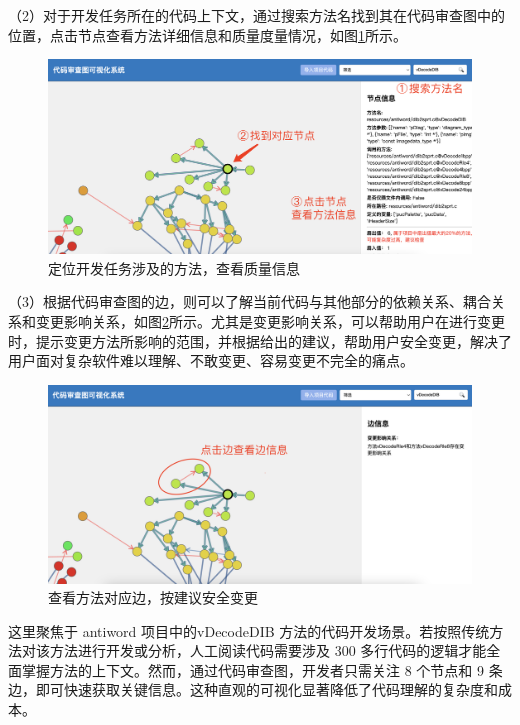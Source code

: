 \noindent（2）对于开发任务所在的代码上下文，通过搜索方法名找到其在代码审查图中的位置，点击节点查看方法详细信息和质量度量情况，如图\ref{1_定位开发任务涉及的方法，查看质量信息}所示。

\begin{figure}[h]
\centering
\includegraphics[width = 1.0\textwidth]{figures/开发2.jpg}
\caption{定位开发任务涉及的方法，查看质量信息}
\label{1_定位开发任务涉及的方法，查看质量信息}
\end{figure}

\noindent（3）根据代码审查图的边，则可以了解当前代码与其他部分的依赖关系、耦合关系和变更影响关系，如图\ref{1_查看方法对应边，按建议安全变更}所示。尤其是变更影响关系，可以帮助用户在进行变更时，提示变更方法所影响的范围，并根据给出的建议，帮助用户安全变更，解决了用户面对复杂软件难以理解、不敢变更、容易变更不完全的痛点。


\begin{figure}[h]
\centering
\includegraphics[width = 1.0\textwidth]{figures/开发3.jpg}
\caption{查看方法对应边，按建议安全变更}
\label{1_查看方法对应边，按建议安全变更}
\end{figure}

这里聚焦于 antiword 项目中的vDecodeDIB 方法的代码开发场景。若按照传统方法对该方法进行开发或分析，人工阅读代码需要涉及 300 多行代码的逻辑才能全面掌握方法的上下文。然而，通过代码审查图，开发者只需关注 8 个节点和 9 条边，即可快速获取关键信息。这种直观的可视化显著降低了代码理解的复杂度和成本。

